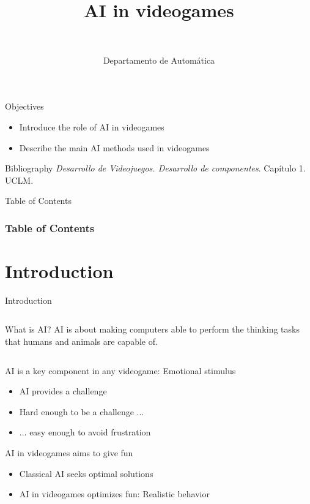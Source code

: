 \documentclass[10pt,compress]{beamer} %
\title[AI in videogames]{AI in videogames}
\author{\asignatura\\\carrera}
\institute{}
\date{Departamento de Automática}
\begin{document}
{\titlepageBlue
    \begin{frame}
        \titlepage
    \end{frame}
}

\institute{\asignatura}

\begin{frame}[plain]{}
   \begin{block}{Objectives}
       \begin{itemize}
        \item Introduce the role of AI in videogames
        \item Describe the main AI methods used in videogames
       \end{itemize}
   \end{block}

   \begin{block}{Bibliography}
       \textit{Desarrollo de Videojuegos. Desarrollo de componentes}. Capítulo 1. UCLM.
   \end{block}
\end{frame}

{
\begin{frame}[shrink]{Table of Contents}
 \frametitle{Table of Contents}
 \tableofcontents
\end{frame}
}

\section{Introduction}

\begin{frame}{Introduction}
    \begin{columns}
	\vspace{-0.5cm}
		\vspace{-0.5cm}
		\begin{block}{What is AI?}
		AI is about making computers able to perform the thinking tasks that humans and animals are capable of.\\
		\end{block}
	\end{columns}
		\vspace{0.25cm}
	AI is a key component in any videogame: \alert{Emotional stimulus}
	\begin{itemize}
		\item AI provides a challenge
		\item Hard enough to be a challenge ...
		\item ... easy enough to avoid frustration
  	\end{itemize}
	AI in videogames aims to give fun
	\begin{itemize}
		\item Classical AI seeks optimal solutions
		\item AI in videogames optimizes fun: Realistic behavior
  	\end{itemize}
\end{frame}
\end{document}
